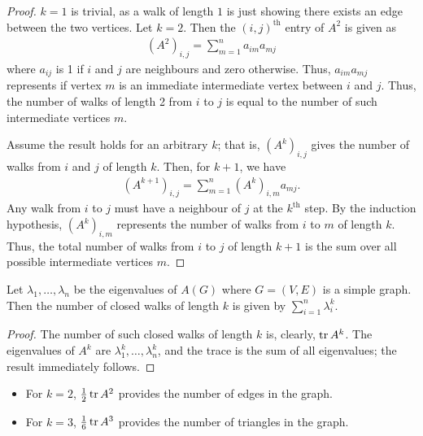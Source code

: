\begin{proof}
    $k = 1$ is trivial, as a walk of length $1$ is just showing there exists an edge between the two vertices. Let $k = 2$. Then the $(i,j)^{\text{th}}$ entry of $A^{2}$ is given as
    \begin{align}
        (A^{2})_{i,j} = \sum_{m=1}^{n} a_{im} a_{mj}
    \end{align}
    where $a_{ij}$ is 1 if $i$ and $j$ are neighbours and zero otherwise. Thus, $a_{im}a_{mj}$ represents if vertex $m$ is an immediate intermediate vertex between $i$ and $j$. Thus, the number of walks of length 2 from $i$ to $j$ is equal to the number of such intermediate vertices $m$.

    Assume the result holds for an arbitrary $k$; that is, $(A^{k})_{i,j}$ gives the number of walks from $i$ and $j$ of length $k$. Then, for $k+1$, we have
    \begin{align}
        (A^{k+1})_{i,j} = \sum_{m=1}^{n} (A^{k})_{i,m} a_{mj}.
    \end{align}
    Any walk from $i$ to $j$ must have a neighbour of $j$ at the $k^{\text{th}}$ step. By the induction hypothesis, $(A^{k})_{i,m}$ represents the number of walks from $i$ to $m$ of length $k$. Thus, the total number of walks from $i$ to $j$ of length $k+1$ is the sum over all possible intermediate vertices $m$.
\end{proof}

\begin{theorem}
    Let $\lambda_{1},\ldots,\lambda_{n}$ be the eigenvalues of $A(G)$ where $G = (V,E)$ is a simple graph. Then the number of closed walks of length $k$ is given by $\sum_{i=1}^{n} \lambda_{i}^{k}$.
\end{theorem}
\begin{proof}
    The number of such closed walks of length $k$ is, clearly, $\operatorname{tr} A^{k}$. The eigenvalues of $A^{k}$ are $\lambda_{1}^{k},\ldots,\lambda_{n}^{k}$, and the trace is the sum of all eigenvalues; the result immediately follows.
\end{proof}

\begin{remark}
    \begin{itemize}
        \item For $k = 2$, $\frac{1}{2}\operatorname{tr} A^{2}$ provides the number of edges in the graph.
        \item For $k = 3$, $\frac{1}{6}\operatorname{tr} A^{3}$ provides the number of triangles in the graph.
    \end{itemize}
\end{remark}

